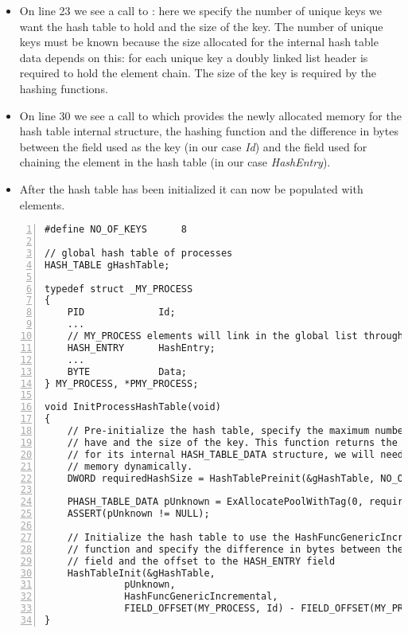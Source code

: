 \begin{appendices}
\begin{itemize}
	\item On line 23 we see a call to : here we specify the number of unique
	keys we want the hash table to hold and the size of the key. The number of unique keys must be
	known because the size allocated for the internal hash table data depends on this: for each
	unique key a doubly linked list header is required to hold the element chain. The size of the
	key is required by the hashing functions.
	
	\item On line 30 we see a call to  which provides the newly allocated
	memory for the hash table internal structure, the hashing function and the difference in bytes
	between the field used as the key (in our case \textit{Id}) and the field used for chaining the
	element in the hash table (in our case \textit{HashEntry}).
	
	\item After the hash table has been initialized it can now be populated with elements.
\end{itemize}

\begin{lstlisting}[caption={Hash Initialization Example},label={lst:HashInitEg},numbers=left]
#define NO_OF_KEYS		8

// global hash table of processes
HASH_TABLE gHashTable;

typedef struct _MY_PROCESS
{
	PID 			Id;
	...
	// MY_PROCESS elements will link in the global list through the HashEntry field
	HASH_ENTRY		HashEntry;
	...
	BYTE			Data;
} MY_PROCESS, *PMY_PROCESS;

void InitProcessHashTable(void)
{
	// Pre-initialize the hash table, specify the maximum number of keys we want it to 
	// have and the size of the key. This function returns the size in bytes required
	// for its internal HASH_TABLE_DATA structure, we will need to allocate this
	// memory dynamically.
	DWORD requiredHashSize = HashTablePreinit(&gHashTable, NO_OF_KEYS, sizeof(PID));
	
	PHASH_TABLE_DATA pUnknown = ExAllocatePoolWithTag(0, requiredHashSize, HEAP_TEST_TAG, 0);
	ASSERT(pUnknown != NULL);
	
	// Initialize the hash table to use the HashFuncGenericIncremental hashing
	// function and specify the difference in bytes between the offset to the Key 
	// field and the offset to the HASH_ENTRY field
	HashTableInit(&gHashTable, 
		      pUnknown, 
		      HashFuncGenericIncremental, 
		      FIELD_OFFSET(MY_PROCESS, Id) - FIELD_OFFSET(MY_PROCESS, HashEntry));
}
\end{lstlisting}


\end{appendices}
